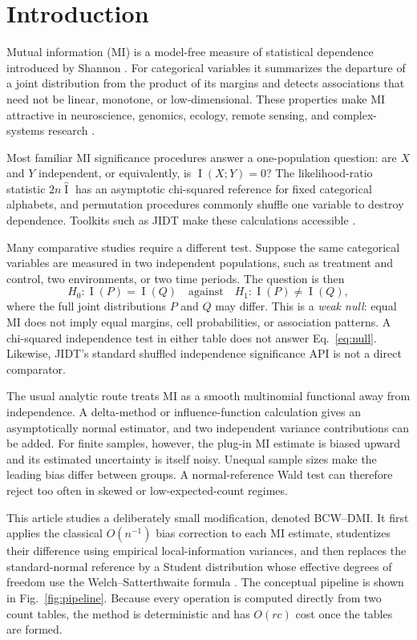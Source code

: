 \documentclass[10pt,twocolumn]{article}
\newcommand{\MI}{\operatorname{I}}
\newcommand{\method}{BCW--DMI}
\begin{document}
\section{Introduction}

Mutual information (MI) is a model-free measure of statistical dependence
introduced by Shannon \citep{shannon1948}. For categorical variables it
summarizes the departure of a joint distribution from the product of its
margins and detects associations that need not be linear, monotone, or
low-dimensional. These properties make MI attractive in neuroscience,
genomics, ecology, remote sensing, and complex-systems research
\citep{brillinger2004,lizier2014}.

Most familiar MI significance procedures answer a one-population question:
are \(X\) and \(Y\) independent, or equivalently, is \(\MI(X;Y)=0\)?
The likelihood-ratio statistic \(2n\widehat{\MI}\) has an asymptotic
chi-squared reference for fixed categorical alphabets, and permutation
procedures commonly shuffle one variable to destroy dependence. Toolkits such
as JIDT make these calculations accessible \citep{lizier2014}.

Many comparative studies require a different test. Suppose the same
categorical variables are measured in two independent populations, such as
treatment and control, two environments, or two time periods. The question is
then
\begin{equation}
  H_0:\MI(P)=\MI(Q)
  \quad\text{against}\quad
  H_1:\MI(P)\ne\MI(Q),
  \label{eq:null}
\end{equation}
where the full joint distributions \(P\) and \(Q\) may differ. This is a
\emph{weak null}: equal MI does not imply equal margins, cell probabilities,
or association patterns. A chi-squared independence test in either table does
not answer Eq.~\eqref{eq:null}. Likewise, JIDT's standard shuffled
independence significance API is not a direct comparator.

The usual analytic route treats MI as a smooth multinomial functional away
from independence. A delta-method or influence-function calculation gives an
asymptotically normal estimator, and two independent variance contributions
can be added. For finite samples, however, the plug-in MI estimate is biased
upward and its estimated uncertainty is itself noisy. Unequal sample sizes
make the leading bias differ between groups. A normal-reference Wald test can
therefore reject too often in skewed or low-expected-count regimes.

This article studies a deliberately small modification, denoted \method{}.
It first
applies the classical \(O(n^{-1})\) bias correction to each MI estimate,
studentizes their difference using empirical local-information variances, and
then replaces the standard-normal reference by a Student distribution whose
effective degrees of freedom use the Welch--Satterthwaite formula
\citep{satterthwaite1946,welch1947}. The conceptual pipeline is shown in
Fig.~\ref{fig:pipeline}. Because every operation is computed directly from two
count tables, the method is deterministic and has \(O(rc)\) cost once the
tables are formed.
\end{document}
